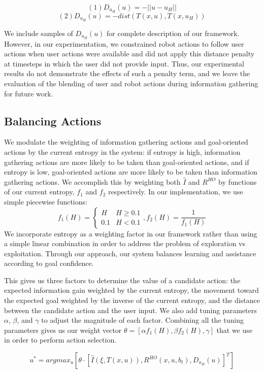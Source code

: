 \documentclass[conference]{IEEEtran}
\begin{document}
\[
(1) D_{u_H}(u) = -||u - u_H||
\]
\[
(2) D_{u_H}(u) = -dist(T(x,u), T(x, u_H))
\]

We include samples of $D_{u_H}(u)$ for complete description of our framework. However, in our experimentation, we constrained robot actions to follow user actions when user actions were available and did not apply this distance penalty at timesteps in which the user did not provide input. Thus, our experimental results do not demonstrate the effects of such a penalty term, and we leave the evaluation of the blending of user and robot actions during information gathering for future work.

\subsection{Balancing Actions}

We modulate the weighting of information gathering actions and goal-oriented actions by the current entropy in the system: if entropy is high, information gathering actions are more likely to be taken than goal-oriented actions, and if entropy is low, goal-oriented actions are more likely to be taken than information gathering actions. We accomplish this by weighting both $\hat{I}$ and $R^{HO}$ by functions of our current entropy, $f_1$ and $f_2$ respectively. In our implementation, we use simple piecewise functions:
\[
f_1(H) =
\begin{cases}
H & H\geq 0.1 \\
0.1 & H < 0.1
\end{cases}
,f_2(H) = \frac{1}{f_1(H)}
\]
We incorporate entropy as a weighting factor in our framework rather than using a simple linear combination in order to address the problem of exploration vs exploitation. Through our approach, our system balances learning and assistance according to goal confidence.

This gives us three factors to determine the value of a candidate action: the expected information gain weighted by the current entropy, the movement toward the expected goal weighted by the inverse of the current entropy, and the distance between the candidate action and the user input. We also add tuning parameters $\alpha$, $\beta$, and $\gamma$ to adjust the magnitude of each factor. Combining all the tuning parameters gives us our weight vector $\theta = [\alpha f_1(H), \beta f_2(H), \gamma]$ that we use in order to perform action selection.

\[
u^* = argmax_u [ \theta \cdot [\hat{I}(\xi, T(x,u)), R^{HO}(x,u,b_t), D_{u_H}(u)]^T ]
\]
\end{document}

